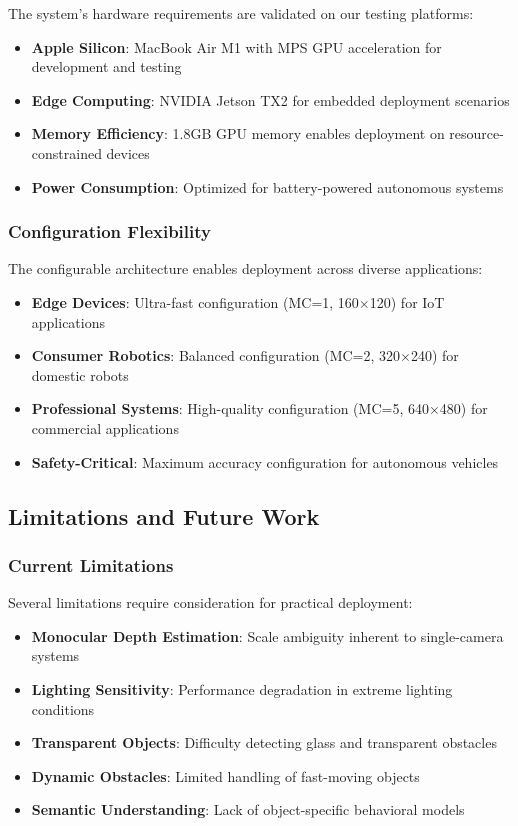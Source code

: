 \documentclass[10pt]{article}
\begin{document}
The system's hardware requirements are validated on our testing platforms:

\begin{itemize}
\item \textbf{Apple Silicon}: MacBook Air M1 with MPS GPU acceleration for development and testing
\item \textbf{Edge Computing}: NVIDIA Jetson TX2 for embedded deployment scenarios
\item \textbf{Memory Efficiency}: 1.8GB GPU memory enables deployment on resource-constrained devices
\item \textbf{Power Consumption}: Optimized for battery-powered autonomous systems
\end{itemize}

\subsubsection{Configuration Flexibility}

The configurable architecture enables deployment across diverse applications:

\begin{itemize}
\item \textbf{Edge Devices}: Ultra-fast configuration (MC=1, 160$\times$120) for IoT applications
\item \textbf{Consumer Robotics}: Balanced configuration (MC=2, 320$\times$240) for domestic robots
\item \textbf{Professional Systems}: High-quality configuration (MC=5, 640$\times$480) for commercial applications
\item \textbf{Safety-Critical}: Maximum accuracy configuration for autonomous vehicles
\end{itemize}

\subsection{Limitations and Future Work}

\subsubsection{Current Limitations}

Several limitations require consideration for practical deployment:

\begin{itemize}
\item \textbf{Monocular Depth Estimation}: Scale ambiguity inherent to single-camera systems
\item \textbf{Lighting Sensitivity}: Performance degradation in extreme lighting conditions
\item \textbf{Transparent Objects}: Difficulty detecting glass and transparent obstacles
\item \textbf{Dynamic Obstacles}: Limited handling of fast-moving objects
\item \textbf{Semantic Understanding}: Lack of object-specific behavioral models
\end{itemize}
\end{document}
